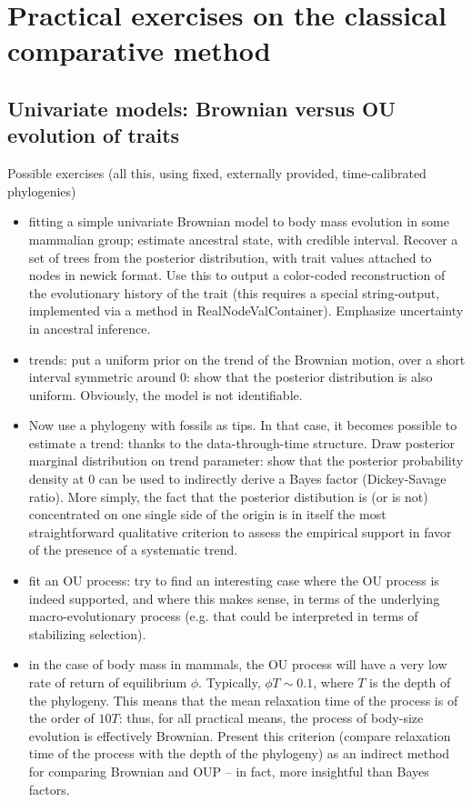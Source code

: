 \documentclass[11pt, oneside]{article}   	%
\begin{document}
\section{Practical exercises on the classical comparative method}

\subsection{Univariate models: Brownian versus OU evolution of traits}

Possible exercises (all this, using fixed, externally provided, time-calibrated phylogenies)
\begin{itemize}
\item
fitting a simple univariate Brownian model to body mass evolution in some mammalian group; estimate ancestral state, with credible interval. Recover a set of trees from the posterior distribution, with trait values attached to nodes in newick format. Use this to output a color-coded reconstruction of the evolutionary history of the trait (this requires a special string-output, implemented via a method in RealNodeValContainer). Emphasize uncertainty in ancestral inference. 
\item
trends: put a uniform prior on the trend of the Brownian motion, over a short interval symmetric around 0: show that the posterior distribution is also uniform. Obviously, the model is not identifiable.
\item
Now use a phylogeny with fossils as tips. In that case, it becomes possible to estimate a trend: thanks to the data-through-time structure. Draw posterior marginal distribution on trend parameter: show that the posterior probability density at 0 can be used to indirectly derive a Bayes factor (Dickey-Savage ratio). More simply, the fact that the posterior distibution is (or is not) concentrated on one single side of the origin is in itself the most straightforward qualitative criterion to assess the empirical support in favor of the presence of a systematic trend. 
\item
fit an OU process:
try to find an interesting case where the OU process is indeed supported, and where this makes sense, in terms of the underlying macro-evolutionary process (e.g. that could be interpreted in terms of stabilizing selection).
\item
in the case of body mass in mammals, the OU process will have a very low rate of return of equilibrium $\phi$. Typically, $\phi T \sim 0.1$, where $T$ is the depth of the phylogeny. This means that the mean relaxation time of the process is of the order of $10 T$: thus, for all practical means, the process of body-size evolution is effectively Brownian. Present this criterion (compare relaxation time of the process with the depth of the phylogeny) as an indirect method for comparing Brownian and OUP -- in fact, more insightful than Bayes factors.
\end{itemize}
\end{document}
